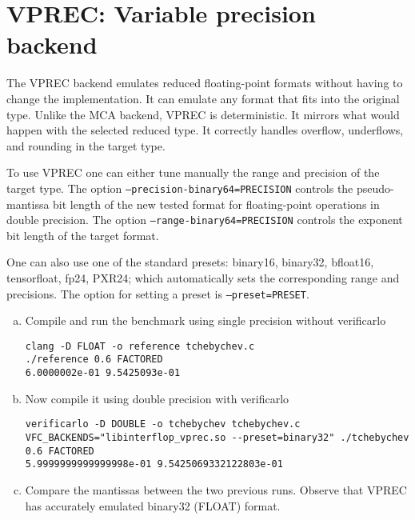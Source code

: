 \section{VPREC: Variable precision backend}

The VPREC backend emulates reduced floating-point formats without having to
change the implementation. It can emulate any format that fits into the original
type. Unlike the MCA backend, VPREC is deterministic. It mirrors what would happen
with the selected reduced type. It correctly handles overflow, underflows, and
rounding in the target type.

To use VPREC one can either tune manually the range and precision of the target
type. The option {\tt --precision-binary64=PRECISION} controls the
pseudo-mantissa bit length of the new tested format for floating-point
operations in double precision. The option {\tt --range-binary64=PRECISION}
controls the exponent bit length of the target format.

One can also use one of the standard presets: binary16, binary32, bfloat16,
tensorfloat, fp24, PXR24; which automatically sets the corresponding range and
precisions. The option for setting a preset is {\tt --preset=PRESET}.


\begin{question}
    \begin{enumerate}[(a)]
        \item Compile and run the benchmark using single precision without verificarlo
              \begin{verbatim}
clang -D FLOAT -o reference tchebychev.c
./reference 0.6 FACTORED
6.0000002e-01 9.5425093e-01
\end{verbatim}
        \item Now compile it using double precision with verificarlo
              \begin{verbatim}
verificarlo -D DOUBLE -o tchebychev tchebychev.c
VFC_BACKENDS="libinterflop_vprec.so --preset=binary32" ./tchebychev 0.6 FACTORED 
5.9999999999999998e-01 9.5425069332122803e-01
\end{verbatim}
        \item Compare the mantissas between the two previous runs. Observe that VPREC has accurately emulated binary32 (FLOAT) format.
    \end{enumerate}
\end{question}


